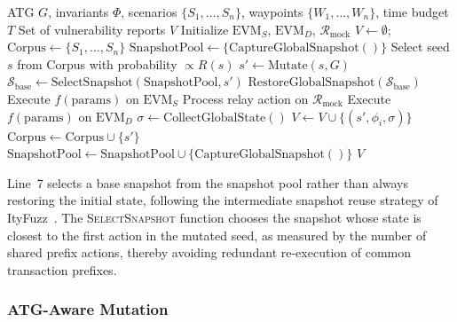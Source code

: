 \documentclass[journal]{IEEEtran}
\begin{document}
\begin{algorithm}[t]
\caption{BridgeSentry Dual-Chain Fuzzing Loop}
\label{alg:fuzzing}
\begin{algorithmic}[1]
\REQUIRE ATG $G$, invariants $\Phi$, scenarios $\{S_1, \ldots, S_n\}$, waypoints $\{W_1, \ldots, W_n\}$, time budget $T$
\ENSURE Set of vulnerability reports $V$
\STATE Initialize $\text{EVM}_S$, $\text{EVM}_D$, $\mathcal{R}_{\text{mock}}$
\STATE $V \gets \emptyset$; $\text{Corpus} \gets \{S_1, \ldots, S_n\}$
\STATE $\text{SnapshotPool} \gets \{\text{CaptureGlobalSnapshot}()\}$
    \STATE Select seed $s$ from Corpus with probability $\propto R(s)$
    \STATE $s' \gets \text{Mutate}(s, G)$ 
    \STATE $\mathcal{S}_{\text{base}} \gets \text{SelectSnapshot}(\text{SnapshotPool}, s')$
    \STATE $\text{RestoreGlobalSnapshot}(\mathcal{S}_{\text{base}})$
            \STATE Execute $f(\text{params})$ on $\text{EVM}_S$
            \STATE Process relay action on $\mathcal{R}_{\text{mock}}$
        \ELSE
            \STATE Execute $f(\text{params})$ on $\text{EVM}_D$
        \ENDIF
    \ENDFOR
    \STATE $\sigma \gets \text{CollectGlobalState}()$
            \STATE $V \gets V \cup \{(s', \phi_i, \sigma)\}$
        \ENDIF
    \ENDFOR
        \STATE $\text{Corpus} \gets \text{Corpus} \cup \{s'\}$
        \STATE $\text{SnapshotPool} \gets \text{SnapshotPool} \cup \{\text{CaptureGlobalSnapshot}()\}$
    \ENDIF
\ENDWHILE
\RETURN $V$
\end{algorithmic}
\end{algorithm}

Line~7 selects a base snapshot from the snapshot pool rather than always restoring the initial state, following the intermediate snapshot reuse strategy of ItyFuzz~\cite{shou2023ityfuzz}. The \textsc{SelectSnapshot} function chooses the snapshot whose state is closest to the first action in the mutated seed, as measured by the number of shared prefix actions, thereby avoiding redundant re-execution of common transaction prefixes.

\subsubsection{ATG-Aware Mutation}
\end{document}
